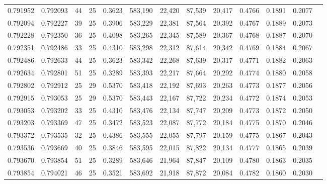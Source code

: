 \begin{tabular}{rrrrrrrrrrrrr}
0.791952 & 0.792093 &    44 &  25 &                                     0.3623 & 583,190 &  22,420 &  87,539 &  20,417 & 0.4766 & 0.1891 & 0.2077 \\
0.792094 & 0.792227 &    39 &  25 &                                     0.3906 & 583,229 &  22,381 &  87,564 &  20,392 & 0.4767 & 0.1889 & 0.2073 \\
0.792228 & 0.792350 &    36 &  25 &                                     0.4098 & 583,265 &  22,345 &  87,589 &  20,367 & 0.4768 & 0.1887 & 0.2070 \\
0.792351 & 0.792486 &    33 &  25 &                                     0.4310 & 583,298 &  22,312 &  87,614 &  20,342 & 0.4769 & 0.1884 & 0.2067 \\
0.792486 & 0.792633 &    44 &  25 &                                     0.3623 & 583,342 &  22,268 &  87,639 &  20,317 & 0.4771 & 0.1882 & 0.2063 \\
0.792634 & 0.792801 &    51 &  25 &                                     0.3289 & 583,393 &  22,217 &  87,664 &  20,292 & 0.4774 & 0.1880 & 0.2058 \\
0.792802 & 0.792912 &    25 &  29 &                                     0.5370 & 583,418 &  22,192 &  87,693 &  20,263 & 0.4773 & 0.1877 & 0.2056 \\
0.792915 & 0.793053 &    25 &  29 &                                     0.5370 & 583,443 &  22,167 &  87,722 &  20,234 & 0.4772 & 0.1874 & 0.2053 \\
0.793053 & 0.793202 &    33 &  25 &                                     0.4310 & 583,476 &  22,134 &  87,747 &  20,209 & 0.4773 & 0.1872 & 0.2050 \\
0.793203 & 0.793369 &    47 &  25 &                                     0.3472 & 583,523 &  22,087 &  87,772 &  20,184 & 0.4775 & 0.1870 & 0.2046 \\
0.793372 & 0.793535 &    32 &  25 &                                     0.4386 & 583,555 &  22,055 &  87,797 &  20,159 & 0.4775 & 0.1867 & 0.2043 \\
0.793536 & 0.793669 &    40 &  25 &                                     0.3846 & 583,595 &  22,015 &  87,822 &  20,134 & 0.4777 & 0.1865 & 0.2039 \\
0.793670 & 0.793854 &    51 &  25 &                                     0.3289 & 583,646 &  21,964 &  87,847 &  20,109 & 0.4780 & 0.1863 & 0.2035 \\
0.793854 & 0.794021 &    46 &  25 &                                     0.3521 & 583,692 &  21,918 &  87,872 &  20,084 & 0.4782 & 0.1860 & 0.2030 \\

\end{tabular}

